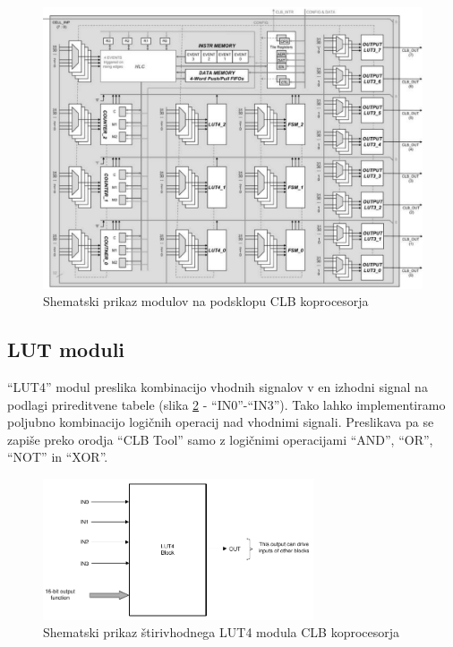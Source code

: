 \documentclass[a4paper]{article}
\begin{document}
\begin{sloppypar}
\begin{figure}[t]
    \begin{center}
        \begin{minipage}[t]{12cm}
            \includegraphics[width=12cm]{clb_moduli}
            \caption{Shematski prikaz modulov na podsklopu CLB koprocesorja
                     \cite[Pogl.~2.3.3]{fpga-to-clb}}
            \label{fig:clb_moduli}
        \end{minipage}
    \end{center}
\end{figure}

\subsection{LUT moduli}\label{sec:lut}
``LUT4'' modul preslika kombinacijo vhodnih signalov v en izhodni signal na podlagi prireditvene tabele (slika
\ref{fig:lut4} - ``IN0''-``IN3''). Tako lahko implementiramo poljubno kombinacijo logičnih operacij nad vhodnimi signali. Preslikava pa se zapiše preko orodja ``CLB Tool'' samo z logičnimi operacijami ``AND'',
``OR'', ``NOT'' in ``XOR''\cite[Pogl.~3.3]{clb-user-guide}. 

\begin{figure}[htb]
    \centerline{\includegraphics[width=8cm]{shema_lut}}
    \caption{Shematski prikaz štirivhodnega LUT4 modula CLB koprocesorja
             \cite[Pogl.~26.4.4]{mcu-ref-manual}}
    \label{fig:lut4} 
\end{figure} 


\end{sloppypar}
\end{document}
